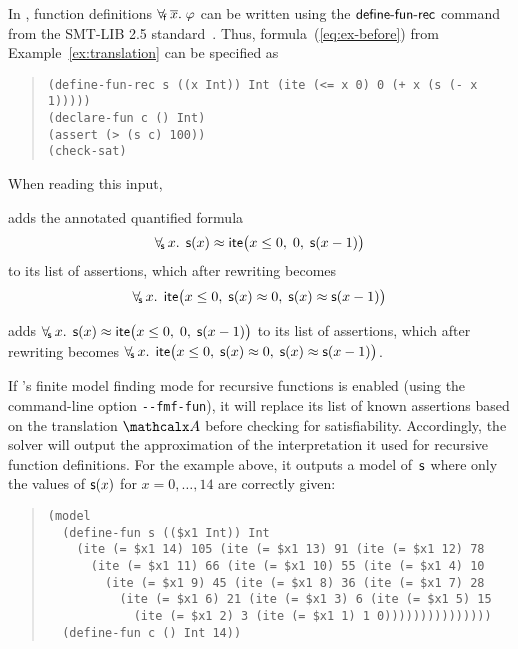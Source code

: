 In \cvc, function definitions $\forall_{\!\mathsf{f}\:} \overline{x}.\; \varphi$ can be written using the $\mathsf{define}\text{-}\mathsf{fun}\text{-}\mathsf{rec}$ command
from the SMT-LIB 2.5 standard~\cite{smtlib25}.
Thus, formula~(\ref{eq:ex-before}) from Example~\ref{ex:translation}
can be specified as %
%
\begin{quote}
\begin{verbatim}
(define-fun-rec s ((x Int)) Int (ite (<= x 0) 0 (+ x (s (- x 1)))))
(declare-fun c () Int)
(assert (> (s c) 100))
(check-sat)
\end{verbatim}
\end{quote}
%
When reading this input,
\begin{rep}%
\cvc adds the annotated quantified formula
$$\forall_{\!\mathsf{s}\:} x.\;\, \mathsf{s}( x ) \approx \mathsf{ite}\bigl( x \leq 0,\; 0,\; \mathsf{s}( x-1 )\bigr)$$
to its list of assertions,
which after rewriting becomes
$$\forall_{\!\mathsf{s}\:} x.\;\, \mathsf{ite}\bigl( x \leq 0,\; \mathsf{s}( x ) \approx 0,\; \mathsf{s}( x ) \approx \mathsf{s}( x-1 ) \bigr)$$
\end{rep}%
\begin{conf}%
\cvc adds
$\forall_{\!\mathsf{s}\:} x.\;\, \mathsf{s}( x ) \approx \mathsf{ite}\bigl( x \leq 0,\; 0,\; \mathsf{s}( x-1 )\bigr)$
to its list of assertions,
which after rewriting becomes
$\forall_{\!\mathsf{s}\:} x.\;\, \mathsf{ite}\bigl( x \leq 0,\; \mathsf{s}( x ) \approx 0,\; \mathsf{s}( x ) \approx \mathsf{s}( x-1 ) \bigr)$. \end{conf}%
If \cvc's finite model finding mode for recursive functions is enabled (using
the command-line option \texttt{-}\texttt{-fmf-fun}), it will replace its list of known
assertions based on the translation $\conv$ before checking for satisfiability.
Accordingly, the solver will output the approximation of the interpretation it
used for recursive function definitions. 
For the example above, it outputs a %
model of~$\mathsf{s}$ where only
the values of $\mathsf{s}(x)$ for $x = 0,\ldots,14$ are correctly given:
\begin{quote}
\begin{verbatim}
(model
  (define-fun s (($x1 Int)) Int 
    (ite (= $x1 14) 105 (ite (= $x1 13) 91 (ite (= $x1 12) 78 
      (ite (= $x1 11) 66 (ite (= $x1 10) 55 (ite (= $x1 4) 10 
        (ite (= $x1 9) 45 (ite (= $x1 8) 36 (ite (= $x1 7) 28 
          (ite (= $x1 6) 21 (ite (= $x1 3) 6 (ite (= $x1 5) 15 
            (ite (= $x1 2) 3 (ite (= $x1 1) 1 0)))))))))))))))
  (define-fun c () Int 14))
\end{verbatim}
\end{quote}


